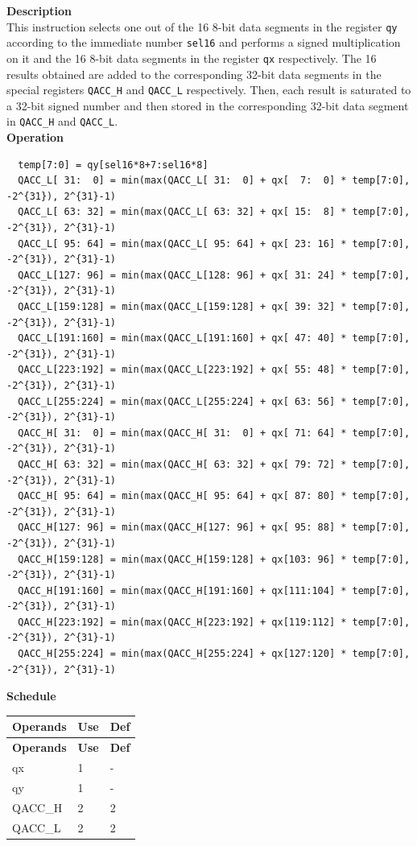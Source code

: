\textbf{Description}\\
This instruction selects one out of the 16 8-bit data segments in the register \lstinline{qy} according to the immediate number \lstinline{sel16} and performs a signed multiplication on it and the 16 8-bit data segments in the register \lstinline{qx} respectively. The 16 results obtained are added to the corresponding 32-bit data segments in the special registers \lstinline{QACC_H} and \lstinline{QACC_L} respectively. Then, each result is saturated to a 32-bit signed number and then stored in the corresponding 32-bit data segment in \lstinline{QACC_H} and \lstinline{QACC_L}.\\
\textbf{Operation}
\begin{lstlisting}
  temp[7:0] = qy[sel16*8+7:sel16*8]
  QACC_L[ 31:  0] = min(max(QACC_L[ 31:  0] + qx[  7:  0] * temp[7:0], -2^{31}), 2^{31}-1)
  QACC_L[ 63: 32] = min(max(QACC_L[ 63: 32] + qx[ 15:  8] * temp[7:0], -2^{31}), 2^{31}-1)
  QACC_L[ 95: 64] = min(max(QACC_L[ 95: 64] + qx[ 23: 16] * temp[7:0], -2^{31}), 2^{31}-1)
  QACC_L[127: 96] = min(max(QACC_L[128: 96] + qx[ 31: 24] * temp[7:0], -2^{31}), 2^{31}-1)
  QACC_L[159:128] = min(max(QACC_L[159:128] + qx[ 39: 32] * temp[7:0], -2^{31}), 2^{31}-1)
  QACC_L[191:160] = min(max(QACC_L[191:160] + qx[ 47: 40] * temp[7:0], -2^{31}), 2^{31}-1)
  QACC_L[223:192] = min(max(QACC_L[223:192] + qx[ 55: 48] * temp[7:0], -2^{31}), 2^{31}-1)
  QACC_L[255:224] = min(max(QACC_L[255:224] + qx[ 63: 56] * temp[7:0], -2^{31}), 2^{31}-1)
  QACC_H[ 31:  0] = min(max(QACC_H[ 31:  0] + qx[ 71: 64] * temp[7:0], -2^{31}), 2^{31}-1)
  QACC_H[ 63: 32] = min(max(QACC_H[ 63: 32] + qx[ 79: 72] * temp[7:0], -2^{31}), 2^{31}-1)
  QACC_H[ 95: 64] = min(max(QACC_H[ 95: 64] + qx[ 87: 80] * temp[7:0], -2^{31}), 2^{31}-1)
  QACC_H[127: 96] = min(max(QACC_H[127: 96] + qx[ 95: 88] * temp[7:0], -2^{31}), 2^{31}-1)
  QACC_H[159:128] = min(max(QACC_H[159:128] + qx[103: 96] * temp[7:0], -2^{31}), 2^{31}-1)
  QACC_H[191:160] = min(max(QACC_H[191:160] + qx[111:104] * temp[7:0], -2^{31}), 2^{31}-1)
  QACC_H[223:192] = min(max(QACC_H[223:192] + qx[119:112] * temp[7:0], -2^{31}), 2^{31}-1)
  QACC_H[255:224] = min(max(QACC_H[255:224] + qx[127:120] * temp[7:0], -2^{31}), 2^{31}-1)

\end{lstlisting}

\textbf{Schedule}\\
\begin{longtable}[c]{|l|l|l|}
    \hline
    \rowcolor{lightgray}
    \textbf{Operands} & \textbf{Use} & \textbf{Def} \\\hline
    \endfirsthead
    \hline
    \rowcolor{lightgray}
     \textbf{Operands} & \textbf{Use} & \textbf{Def} \\\hline
    \endhead
    \hline
    \endfoot

     qx & 1 & - \\\hline
     qy & 1 & - \\\hline
     QACC\_H & 2 & 2 \\\hline
     QACC\_L & 2 & 2

\end{longtable}

